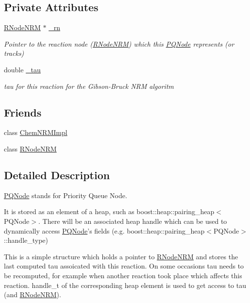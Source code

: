 \subsection*{Private Attributes}
\begin{DoxyCompactItemize}
\item 
\hyperlink{classchem_1_1RNodeNRM}{R\-Node\-N\-R\-M} $\ast$ \hyperlink{classchem_1_1PQNode_ae0ddd94f908ec800ae02f592e83c630d}{\-\_\-rn}
\begin{DoxyCompactList}\small\item\em Pointer to the reaction node (\hyperlink{classchem_1_1RNodeNRM}{R\-Node\-N\-R\-M}) which this \hyperlink{classchem_1_1PQNode}{P\-Q\-Node} represents (or tracks) \end{DoxyCompactList}\item 
double \hyperlink{classchem_1_1PQNode_a77a83fe486c496c3e4bd4ffa72d8fb57}{\-\_\-tau}
\begin{DoxyCompactList}\small\item\em tau for this reaction for the Gibson-\/\-Bruck N\-R\-M algoritm \end{DoxyCompactList}\end{DoxyCompactItemize}
\subsection*{Friends}
\begin{DoxyCompactItemize}
\item 
class \hyperlink{classchem_1_1PQNode_a6dae39f8dddcdbda9b4f6a1c1bf1bda8}{Chem\-N\-R\-M\-Impl}
\item 
class \hyperlink{classchem_1_1PQNode_a9dfcd0d41325e8ca108cba1768ebab89}{R\-Node\-N\-R\-M}
\end{DoxyCompactItemize}


\subsection{Detailed Description}
\hyperlink{classchem_1_1PQNode}{P\-Q\-Node} stands for Priority Queue Node. 

It is stored as an element of a heap, such as boost\-::heap\-::pairing\-\_\-heap$<$\-P\-Q\-Node$>$. There will be an associated heap handle which can be used to dynamically access \hyperlink{classchem_1_1PQNode}{P\-Q\-Node}'s fields (e.\-g. boost\-::heap\-::pairing\-\_\-heap$<$\-P\-Q\-Node$>$\-::handle\-\_\-type)

This is a simple structure which holds a pointer to \hyperlink{classchem_1_1RNodeNRM}{R\-Node\-N\-R\-M} and stores the last computed tau assoicated with this reaction. On some occasions tau needs to be recomputed, for example when another reaction took place which affects this reaction. handle\-\_\-t of the corresponding heap element is used to get access to tau (and \hyperlink{classchem_1_1RNodeNRM}{R\-Node\-N\-R\-M}). 

